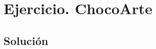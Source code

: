 \documentclass[11pt]{article}
\begin{document}
% 
%
% 
%
% 
%
% 

\section*{Ejercicio. ChocoArte}


\subsection*{Solución}

\end{document}
